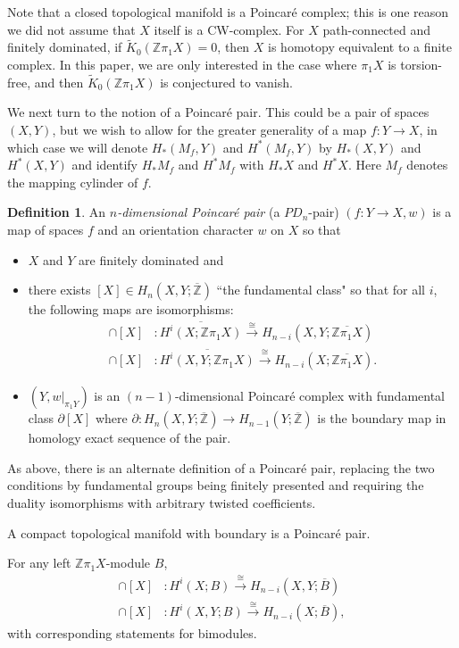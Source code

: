 \documentclass[12pt]{amsart}
\theoremstyle{definition}
\newtheorem{definition}[theorem]{Definition}
\newcommand{\Z}{\mathbb Z}
\newcommand{\ol}[1]{{\overline{#1}}}
\newcommand{\wt}[1]{{\widetilde{#1}}}
\newcommand{\zpx}{\Z\pi_1X}
\begin{document}
Note that a closed topological manifold is a Poincar\'e complex; this is one reason we did not assume that $X$ itself is a CW-complex.    For $X$ path-connected and finitely dominated, if $\wt K_0(\Z \pi_1 X) = 0$, then $X$ is homotopy equivalent to a finite complex.    In this paper, we are only interested in the case where $\pi_1X$ is torsion-free, and then  $\wt K_0(\Z \pi_1 X) $ is conjectured to vanish.  

We next turn to the notion of a Poincar\'e pair.  This could be a pair of spaces $(X,Y)$, but we wish to allow for the greater generality of a map $f : Y \to X$, in which case we will denote $H_*(M_f,Y)$ and $H^*(M_f,Y)$ by $H_*(X,Y)$ and $H^*(X,Y)$ and identify $H_*M_f$ and $H^*M_f$ with $H_*X$ and $H^*X$.  Here $M_f$ denotes the mapping cylinder of $f$.

\begin{definition}
 An {\em $n$-dimensional Poincar\'e pair} (a $PD_n$-pair) $(f: Y \to X,w)$ is a map of spaces $f$ and    an orientation character $w$ on $X$ so that
 
\begin{itemize}
 \item $X$ and $Y$ are finitely dominated and
 \item there exists  $[X] \in H_n(X,Y; \ol\Z)$ ``the fundamental class" so that for all $i$, the following maps are isomorphisms:
 \begin{align*}
  \cap [X] & :  \ol{H^i(X; \zpx)} \xrightarrow{\cong} H_{n-i}(X,Y; \ol\zpx) \\
  \cap [X] & :  \ol{H^i(X,Y; \zpx)} \xrightarrow{\cong} H_{n-i}(X; \ol\zpx).
 \end{align*}
 
 \item $(Y, w|_{\pi_1Y})$ is an $(n-1)$-dimensional Poincar\'e complex with fundamental class $\partial [X]$ where $\partial : H_{n}(X,Y;\ol \Z) \to H_{n-1}(Y;\ol \Z)$ is the boundary map in homology exact sequence of the pair.

\end{itemize}
\end{definition}

As above, there is an alternate definition of a Poincar\'e pair, replacing the two conditions by fundamental groups being finitely presented and requiring the duality isomorphisms with arbitrary twisted coefficients.


A compact topological manifold with boundary is a Poincar\'e pair.   

For any left $\Z\pi_1X$-module $B$, 
 \begin{align*}
  \cap [X] & :  {H^i(X; B)} \xrightarrow{\cong} H_{n-i}(X,Y; \ol B) \\
  \cap [X] & :  {H^i(X,Y; B)} \xrightarrow{\cong} H_{n-i}(X; \ol B),
 \end{align*}
 with corresponding statements for bimodules.
\end{document}
